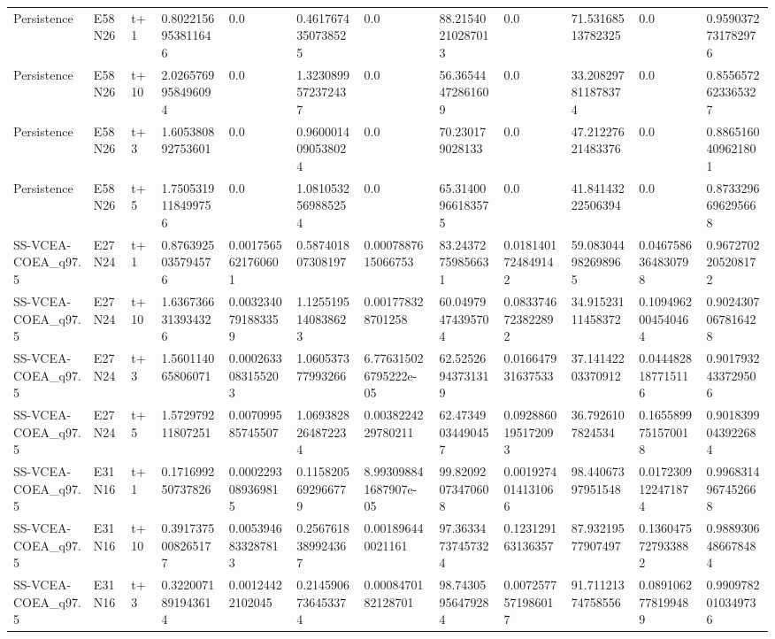 \begin{landscape}
\begin{longtable}{llllllllllll}
Persistence & E58N26 & t+1 & 0.8022156953811646 & 0.0 & 0.4617674350738525 & 0.0 & 88.21540210287013 & 0.0 & 71.53168513782325 & 0.0 & 0.9590372731782976 \\
Persistence & E58N26 & t+10 & 2.0265769958496094 & 0.0 & 1.3230899572372437 & 0.0 & 56.36544472861609 & 0.0 & 33.208297811878374 & 0.0 & 0.8556572623365327 \\
Persistence & E58N26 & t+3 & 1.605380892753601 & 0.0 & 0.9600014090538024 & 0.0 & 70.230179028133 & 0.0 & 47.21227621483376 & 0.0 & 0.8865160409621801 \\
Persistence & E58N26 & t+5 & 1.7505319118499756 & 0.0 & 1.0810532569885254 & 0.0 & 65.31400966183575 & 0.0 & 41.84143222506394 & 0.0 & 0.8733296696295668 \\
SS-VCEA-COEA\_q97.5 & E27N24 & t+1 & 0.8763925035794576 & 0.0017565621760601 & 0.587401807308197 & 0.0007887615066753 & 83.24372759856631 & 0.0181401724849142 & 59.083044982698965 & 0.0467586364830798 & 0.9672702205208172 \\
SS-VCEA-COEA\_q97.5 & E27N24 & t+10 & 1.6367366313934326 & 0.0032340791883359 & 1.1255195140838623 & 0.001778328701258 & 60.04979474395704 & 0.0833746723822892 & 34.91523111458372 & 0.1094962004540464 & 0.9024307067816428 \\
SS-VCEA-COEA\_q97.5 & E27N24 & t+3 & 1.560114065806071 & 0.0002633083155203 & 1.060537377993266 & 6.776315026795222e-05 & 62.52526943731319 & 0.016647931637533 & 37.14142203370912 & 0.0444828187715116 & 0.9017932433729506 \\
SS-VCEA-COEA\_q97.5 & E27N24 & t+5 & 1.572979211807251 & 0.007099585745507 & 1.0693828264872234 & 0.0038224229780211 & 62.47349034490457 & 0.0928860195172093 & 36.7926107824534 & 0.1655899751570018 & 0.9018399043922684 \\
SS-VCEA-COEA\_q97.5 & E31N16 & t+1 & 0.171699250737826 & 0.0002293089369815 & 0.1158205692966779 & 8.993098841687907e-05 & 99.82092073470608 & 0.0019274014131066 & 98.44067397951548 & 0.0172309122471874 & 0.9968314967452668 \\
SS-VCEA-COEA\_q97.5 & E31N16 & t+10 & 0.3917375008265177 & 0.0053946833287813 & 0.2567618389924367 & 0.001896440021161 & 97.36334737457324 & 0.123129163136357 & 87.93219577907497 & 0.1360475727933882 & 0.9889306486678484 \\
SS-VCEA-COEA\_q97.5 & E31N16 & t+3 & 0.3220071891943614 & 0.00124422102045 & 0.2145906736453374 & 0.0008470182128701 & 98.74305956479284 & 0.0072577571986017 & 91.71121374758556 & 0.0891062778199489 & 0.9909782010349736 \\

\end{longtable}
\end{landscape}
